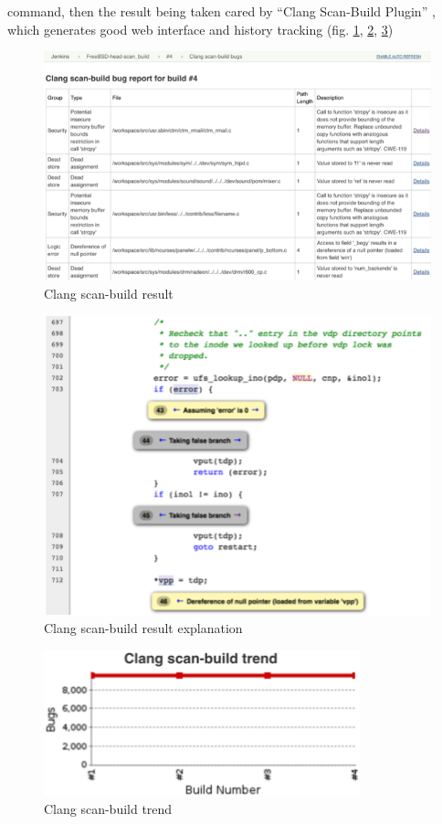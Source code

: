 \documentclass[a4paper,twocolumn,10pt]{article}
\begin{document}
command, then the result being taken cared by ``Clang Scan-Build Plugin'' \cite{jenkins-clang-scan-build-plugin},
which generates good web interface and history tracking (fig.
\ref{scan-build-result}, \ref{scan-build-path}, \ref{clang-scan-build-trend})

\begin{figure}
\includegraphics[width=\textwidth]{scan-build-result.png}
\caption{Clang scan-build result}
\label{scan-build-result}
\end{figure}

\begin{figure}
\includegraphics[width=\textwidth]{scan-build-path.png}
\caption{Clang scan-build result explanation}
\label{scan-build-path}
\end{figure}

\begin{figure}
\includegraphics{clang-scan-build-trend.png}
\caption{Clang scan-build trend}
\label{clang-scan-build-trend}
\end{figure}
\end{document}
